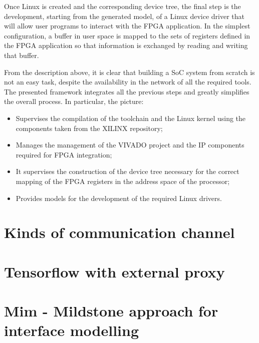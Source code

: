 Once Linux is created and the corresponding device tree, the final step is the development, starting from the generated model, of a Linux device driver that will allow user programs to interact with the FPGA application. In the simplest configuration, a buffer in user space is mapped to the sets of registers defined in the FPGA application so that information is exchanged by reading and writing that buffer.

From the description above, it is clear that building a SoC system from scratch is not an easy task, despite the availability in the network of all the required tools. The presented framework integrates all the previous steps and greatly simplifies the overall process. In particular, the picture:
\begin{itemize}
    \item Supervises the compilation of the toolchain and the Linux kernel using the components taken from the XILINX repository;
    \item Manages the management of the VIVADO project and the IP components required for FPGA integration;
    \item It supervises the construction of the device tree necessary for the correct mapping of the FPGA registers in the address space of the processor;
    \item Provides models for the development of the required Linux drivers.
\end{itemize}

\section{Kinds of communication channel}
\section{Tensorflow with external proxy}
\section{Mim - Mildstone approach for interface modelling}
